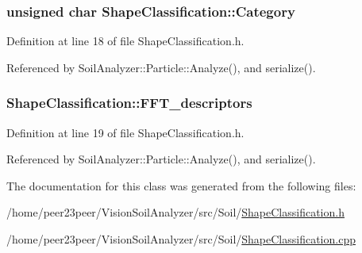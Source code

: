 \subsubsection[{Category}]{\setlength{\rightskip}{0pt plus 5cm}unsigned char Shape\+Classification\+::\+Category}\label{class_shape_classification_a5b723e358b86496ed6f4b25e2bf7af17}


Definition at line 18 of file Shape\+Classification.\+h.



Referenced by Soil\+Analyzer\+::\+Particle\+::\+Analyze(), and serialize().

\hypertarget{class_shape_classification_afecc3c98ca8a930b359ddd936aad21f3}{}
\subsubsection[{F\+F\+T\+\_\+descriptors}]{ Shape\+Classification\+::\+F\+F\+T\+\_\+descriptors}\label{class_shape_classification_afecc3c98ca8a930b359ddd936aad21f3}


Definition at line 19 of file Shape\+Classification.\+h.



Referenced by Soil\+Analyzer\+::\+Particle\+::\+Analyze(), and serialize().



The documentation for this class was generated from the following files\+:\begin{DoxyCompactItemize}
\item 
/home/peer23peer/\+Vision\+Soil\+Analyzer/src/\+Soil/\hyperlink{_shape_classification_8h}{Shape\+Classification.\+h}\item 
/home/peer23peer/\+Vision\+Soil\+Analyzer/src/\+Soil/\hyperlink{_shape_classification_8cpp}{Shape\+Classification.\+cpp}\end{DoxyCompactItemize}
